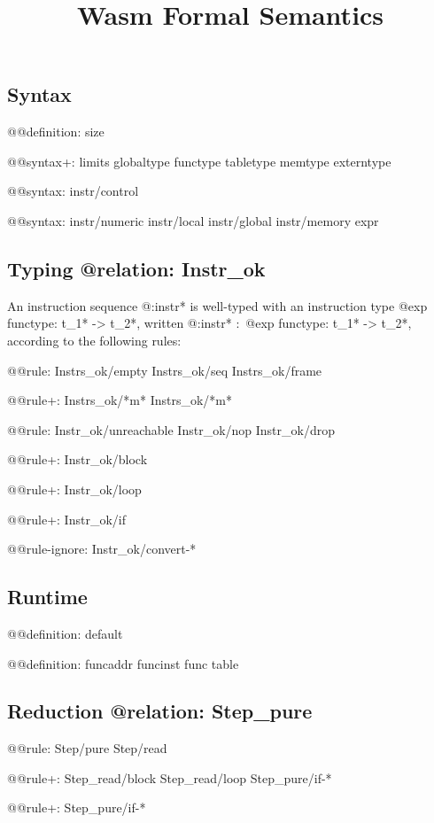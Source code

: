 \documentclass[a4paper]{scrartcl}
\title{Wasm Formal Semantics}
\begin{document}
\small

\maketitle


\subsection*{Syntax}

@@{definition: size}

@@{syntax+:
  limits
  {globaltype
  functype
  tabletype
  memtype}
  {}
  externtype
}

@@{syntax: {instr/control}}

@@{syntax: {instr/numeric instr/local instr/global instr/memory} expr}


\subsection*{Typing @{relation: Instr_ok}}

An instruction sequence @{:instr*} is well-typed with an instruction type @{exp functype: t_1* -> t_2*}, written @{:instr*} $:$ @{exp functype: t_1* -> t_2*}, according to the following rules:

@@{rule:
  {Instrs_ok/empty Instrs_ok/seq}
  {Instrs_ok/frame}
}

@@{rule+: Instrs_ok/*m* {Instrs_ok/*m*}}

@@{rule: {Instr_ok/unreachable Instr_ok/nop Instr_ok/drop}}

@@{rule+: Instr_ok/block}

@@{rule+: Instr_ok/loop}

@@{rule+: Instr_ok/if}


@@{rule-ignore: Instr_ok/convert-*}


\subsection*{Runtime}

@@{definition: default}

@@{definition: {funcaddr funcinst} {func table}}


\subsection*{Reduction @{relation: Step_pure}}

@@{rule: Step/pure Step/read}

@@{rule+: {Step_read/block Step_read/loop} {Step_pure/if-*}}

@@{rule+: Step_pure/if-*}
\end{document}
